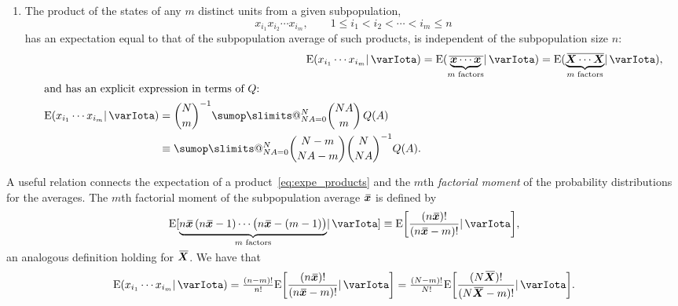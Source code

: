 \documentclass{article}
\makeatletter
\theoremstyle{remark}
\theoremstyle{innote}
\def\sum{\DOTSI\sumop\slimits@}
\newcommand*{\citep}{\parencites}
\renewcommand*{\|}{\mathpunct{|}}%
\renewcommand{\le}{\leqslant}%
\DeclarePairedDelimiter\clcl{[}{]}
\newcommand*{\E}{\mathrm{E}}
\DeclarePairedDelimiter\expp{(}{)}
\newcommand*{\expe}{\E\expp}%
\newcommand*{\expeb}{\E\clcl}%
\theoremstyle{simple}
\newcommand*{\widebar}[1]{{\mkern1.5mu\skew{2}\overline{\mkern-1.5mu#1\mkern-1.5mu}\mkern 1.5mu}}
\newcommand*{\av}{\widebar} %
\newcommand*{\sav}{\widebar} %
\newcommand*{\yxx}{x}%
\newcommand*{\yx}{\bm{\yxx}}%
\newcommand*{\yxs}{\sav{\yx}}%
\newcommand*{\yX}{\bm{X}}%
\newcommand*{\yXf}{\av{\yX}}%
\newcommand*{\yH}{\varIota}
\makeatother
\begin{document}
\begin{enumerate}
\medskip
\item\label{item:moments}The product of the states of any $m$ distinct
  units from a given subpopulation,
  \begin{equation*}
    x_{i_1} x_{i_2} \dotsm x_{i_m},
    \qquad 1\le i_1 < i_2 < \dotsb < i_m \le n
  \end{equation*}
  has an expectation equal to that of the subpopulation average of such
  products, is independent of the subpopulation size $n$:
\begin{subequations}
\label{eq:expe_products}
\begin{align}
  \expe{x_{i_1} \dotsm x_{i_m} \| \yH}
&=
\expe{\sav{\underbrace{\yx \dotsm \yx}_{\text{$m$ factors}}} \| \yH}
=
\expe{\av{\underbrace{\yX \dotsm \yX}_{\text{$m$ factors}}} \| \yH},
\\
\intertext{and has an explicit expression in terms of $Q$:}
  \begin{split}
\expe{x_{i_1} \dotsm x_{i_m} \| \yH}
&=
\binom{N}{m}^{-1}
\sum_{N A=0}^N %
\binom{N A}{m}\, Q(A)
\\
&\equiv
\sum_{N A=0}^N %
\binom{N-m}{N A-m}
\binom{N}{N A}^{-1} Q(A).
\end{split}
\end{align}
\end{subequations}
\end{enumerate}

\medskip


A useful relation connects the expectation of a
product~\eqref{eq:expe_products} and the $m$th \emph{factorial moment}
\citep{potts1953} of the probability distributions for the averages. The
$m$th factorial moment of the subpopulation average $\yxs$ is defined by
\begin{equation}
  \label{eq:fact_mom_defin}
\vphantom{\underbrace{\yxs}_{m}}\expeb*{
\smash{\underbrace{n\yxs\,(n\yxs-1)\dotsm \bigl(n\yxs-(m-1)\bigr)}_{\text{$m$ factors}}}
\| \yH}
\equiv \expeb*{\frac{(n\yxs)!}{(n\yxs-m)!} \| \yH},
\end{equation}
an analogous definition holding for $\yXf$. We have that
\begin{equation}
  \label{eq:eq_factmom_prod}
\expe{x_{i_1} \dotsm x_{i_m} \| \yH}
=
  \tfrac{(n-m)!}{n!}\expeb*{\frac{(n\yxs)!}{(n\yxs-m)!} \| \yH}
=
  \tfrac{(N-m)!}{N!}\expeb*{\frac{(N\yXf)!}{(N\yXf-m)!} \| \yH}.
\end{equation}
\end{document}
